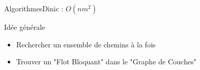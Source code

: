 \begin{frame}{Algorithmes}{Dinic : $O(nm^2)$}
\begin{block}{Idée générale}
\begin{itemize}
\item Rechercher un ensemble de chemins à la fois
\item Trouver un "Flot Bloquant" dans le "Graphe de Couches"
\end{itemize}
\end{block}
\end{frame}
